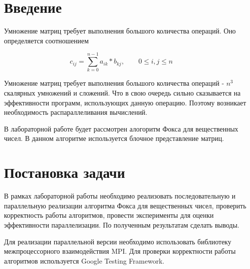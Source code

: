 \documentclass{report}
\begin{document}
\setcounter{page}{2}

\tableofcontents
\newpage

\section*{Введение}
Умножение матриц требует выполнения большого количества операций.  Оно определяется соотношением
\par$$
    c_{ij} = \sum_{k=0}^{n-1} a_{ik} * b_{kj},\qquad 0 \le i,j \le n \qquad
    $$

Умножение матриц требует выполнения большого количества операций - $n^3$ скалярных умножений и сложений. Что в свою очередь сильно сказывается на эффективности программ, использующих данную операцию. Поэтому возникает необходимость распараллеливания вычислений.
\par В лабораторной работе будет рассмотрен алогоритм Фокса для вещественных чисел. В данном алгоритме используется блочное представление матриц.

\newpage

\section*{Постановка задачи}
В рамках лабораторной работы необходимо реализовать последовательную и параллельную реализации алгоритма Фокса для вещественных чисел, проверить корректность работы алгоритмов, провести эксперименты для оценки эффективности параллелизации. По полученным результатам сделать выводы.
\par Для реализации параллельной версии необходимо использовать библиотеку межпроцессорного взаимодействия MPI. Для проверки корректности работы алгоритмов используется Google Testing Framework.
\newpage

\end{document}
